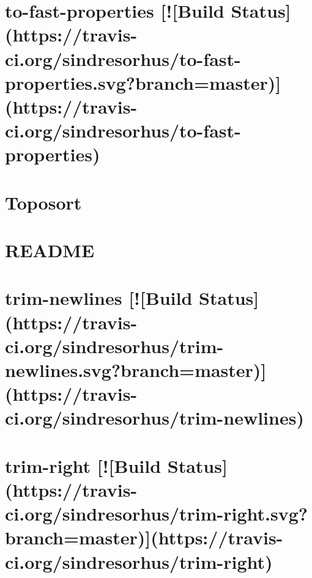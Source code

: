 \documentclass[twoside]{book}
\newcommand{\+}{\discretionary{\mbox{\scriptsize$\hookleftarrow$}}{}{}}
\begin{document}
\chapter{to-\/fast-\/properties \mbox{[}!\mbox{[}Build Status\mbox{]}(https\+://travis-\/ci.org/sindresorhus/to-\/fast-\/properties.svg?branch=master)\mbox{]}(https\+://travis-\/ci.org/sindresorhus/to-\/fast-\/properties)}
\label{md__c_1_workspace_demo_src_main_script_node_modules_to-fast-properties_readme}

\chapter{Toposort}
\label{md__c_1_workspace_demo_src_main_script_node_modules_toposort__r_e_a_d_m_e}

\chapter{R\+E\+A\+D\+ME}
\label{md__c_1_workspace_demo_src_main_script_node_modules_tough-cookie__r_e_a_d_m_e}

\chapter{trim-\/newlines \mbox{[}!\mbox{[}Build Status\mbox{]}(https\+://travis-\/ci.org/sindresorhus/trim-\/newlines.svg?branch=master)\mbox{]}(https\+://travis-\/ci.org/sindresorhus/trim-\/newlines)}
\label{md__c_1_workspace_demo_src_main_script_node_modules_trim-newlines_readme}

\chapter{trim-\/right \mbox{[}!\mbox{[}Build Status\mbox{]}(https\+://travis-\/ci.org/sindresorhus/trim-\/right.svg?branch=master)\mbox{]}(https\+://travis-\/ci.org/sindresorhus/trim-\/right)}
\label{md__c_1_workspace_demo_src_main_script_node_modules_trim-right_readme}

\end{document}
